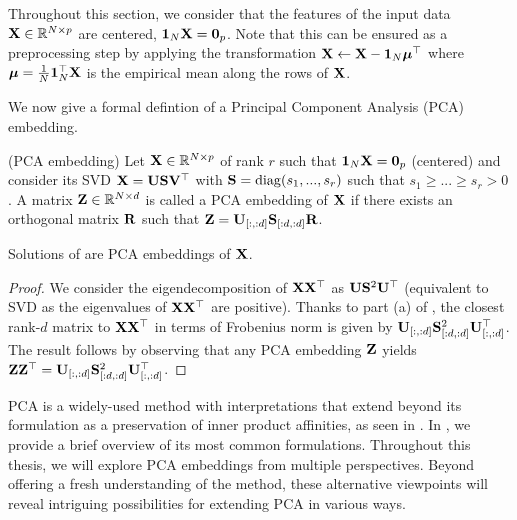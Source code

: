 \begin{remark}
	Throughout this section, we consider that the features of the input data ${\mathbf{X}} \in \mathbb{R}^{N \times p}$ are centered, \ie $\bm{1}_N {\mathbf{X}} = \bm{0}_p$. Note that this can be ensured as a preprocessing step by applying the transformation ${\mathbf{X}} \leftarrow {\mathbf{X}} - \bm{1}_N \bm{\mu}^\top$ where $\bm{\mu} = \frac{1}{N} \bm{1}_N^\top {\mathbf{X}}$ is the empirical mean along the rows of ${\mathbf{X}}$.
\end{remark}

We now give a formal defintion of a Principal Component Analysis (PCA) embedding.

\begin{definition}{(PCA embedding)}\label{def:PCA_embedding}
	Let ${\mathbf{X}} \in \mathbb{R}^{N \times p}$ of rank $r$ such that $\bm{1}_N {\mathbf{X}} = \bm{0}_p$ (centered) and consider its SVD ${\mathbf{X}} = {\mathbf{U}} {\mathbf{S}} {\mathbf{V}}^\top$ with ${\mathbf{S}} = \operatorname{diag}(s_1, ..., s_r)$ such that $s_1 \geq ... \geq s_r > 0$. A matrix
	${\mathbf{Z}} \in \mathbb{R}^{N \times d}$ is called a PCA embedding of ${\mathbf{X}}$ if there exists an orthogonal matrix ${\mathbf{R}}$ such that ${\mathbf{Z}} = {\mathbf{U}}_{[:,:d]} {\mathbf{S}}_{[:d,:d]} {\mathbf{R}}$.
\end{definition}

\begin{proposition}
	Solutions of  are PCA embeddings of ${\mathbf{X}}$.
\end{proposition}

\begin{proof}
	We consider the eigendecomposition of ${\mathbf{X}} {\mathbf{X}}^\top$ as ${\mathbf{U}} {\mathbf{S}}^2 {\mathbf{U}}^\top$ (equivalent to SVD as the eigenvalues of ${\mathbf{X}} {\mathbf{X}}^\top$ are positive). Thanks to part (a) of , the closest rank-$d$ matrix to ${\mathbf{X}} {\mathbf{X}}^\top$ in terms of Frobenius norm is given by ${\mathbf{U}}_{[:,:d]} {\mathbf{S}}_{[:d,:d]}^2 {\mathbf{U}}_{[:,:d]}^\top$.
	The result follows by observing that any PCA embedding ${\mathbf{Z}}$ yields ${\mathbf{Z}} {\mathbf{Z}}^\top = {\mathbf{U}}_{[:,:d]} {\mathbf{S}}_{[:d,:d]}^2 {\mathbf{U}}_{[:,:d]}^\top$.
\end{proof}

PCA is a widely-used method with interpretations that extend beyond its formulation as a preservation of inner product affinities, as seen in . In , we provide a brief overview of its most common formulations. Throughout this thesis, we will explore PCA embeddings from multiple perspectives. Beyond offering a fresh understanding of the method, these alternative viewpoints will reveal intriguing possibilities for extending PCA in various ways.

